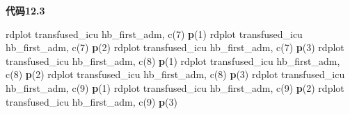 \documentclass[
  chinese-hans,
  letterpaper,
  DIV=11,
  numbers=noendperiod]{scrreprt}
\newenvironment{Shaded}{\begin{snugshade}}{\end{snugshade}}
\newcommand{\KeywordTok}[1]{\textcolor[rgb]{0.00,0.23,0.31}{\textbf{#1}}}
\newcommand{\NormalTok}[1]{\textcolor[rgb]{0.00,0.23,0.31}{#1}}
\begin{document}
\begin{tcolorbox}[enhanced jigsaw, arc=.35mm, bottomrule=.15mm, breakable, colback=white, colframe=quarto-callout-note-color-frame, left=2mm, leftrule=.75mm, opacityback=0, rightrule=.15mm, toprule=.15mm]

\vspace{-3mm}\textbf{代码12.3}\vspace{3mm}

\begin{Shaded}
\begin{Highlighting}[]
\NormalTok{rdplot transfused\_icu hb\_first\_adm, c(7) }\KeywordTok{p}\NormalTok{(1)}
\NormalTok{rdplot transfused\_icu hb\_first\_adm, c(7) }\KeywordTok{p}\NormalTok{(2)}
\NormalTok{rdplot transfused\_icu hb\_first\_adm, c(7) }\KeywordTok{p}\NormalTok{(3)}
\NormalTok{rdplot transfused\_icu hb\_first\_adm, c(8) }\KeywordTok{p}\NormalTok{(1)}
\NormalTok{rdplot transfused\_icu hb\_first\_adm, c(8) }\KeywordTok{p}\NormalTok{(2)}
\NormalTok{rdplot transfused\_icu hb\_first\_adm, c(8) }\KeywordTok{p}\NormalTok{(3)}
\NormalTok{rdplot transfused\_icu hb\_first\_adm, c(9) }\KeywordTok{p}\NormalTok{(1)}
\NormalTok{rdplot transfused\_icu hb\_first\_adm, c(9) }\KeywordTok{p}\NormalTok{(2)}
\NormalTok{rdplot transfused\_icu hb\_first\_adm, c(9) }\KeywordTok{p}\NormalTok{(3)}
\end{Highlighting}
\end{Shaded}

\end{tcolorbox}
\end{document}
